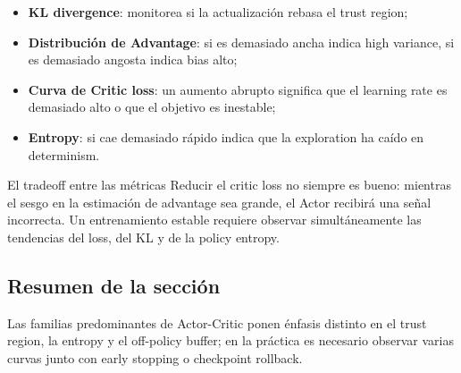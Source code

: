 \begin{itemize}
    \item \textbf{KL divergence}: monitorea si la actualización rebasa el trust region;
    \item \textbf{Distribución de Advantage}: si es demasiado ancha indica high variance, si es demasiado angosta indica bias alto;
    \item \textbf{Curva de Critic loss}: un aumento abrupto significa que el learning rate es demasiado alto o que el objetivo es inestable;
    \item \textbf{Entropy}: si cae demasiado rápido indica que la exploration ha caído en determinism.
\end{itemize}

\begin{warningbox}{El tradeoff entre las métricas}
Reducir el critic loss no siempre es bueno: mientras el sesgo en la estimación de advantage sea grande, el Actor recibirá una señal incorrecta. Un entrenamiento estable requiere observar simultáneamente las tendencias del loss, del KL y de la policy entropy.
\end{warningbox}

\subsection{Resumen de la sección}

Las familias predominantes de Actor-Critic ponen énfasis distinto en el trust region, la entropy y el off-policy buffer; en la práctica es necesario observar varias curvas junto con early stopping o checkpoint rollback.

